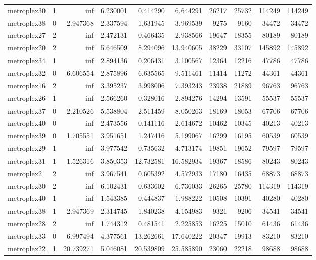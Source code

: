 \begin{longtable}{|l|r|r|r|r|r|r|r|r|r|}
metroplex30 & 1 & inf & 6.230001 & 0.414290 & 6.644291 & 26217 & 25732 & 114249 & 114249 \\
metroplex38 & 0 & 2.947368 & 2.337594 & 1.631945 & 3.969539 & 9275 & 9160 & 34472 & 34472 \\
metroplex27 & 2 & inf & 2.472131 & 0.466435 & 2.938566 & 19647 & 18355 & 80189 & 80189 \\
metroplex20 & 2 & inf & 5.646509 & 8.294096 & 13.940605 & 38229 & 33107 & 145892 & 145892 \\
metroplex34 & 1 & inf & 2.894136 & 0.206431 & 3.100567 & 12364 & 12216 & 47786 & 47786 \\
metroplex32 & 0 & 6.606554 & 2.875896 & 6.635565 & 9.511461 & 11414 & 11272 & 44361 & 44361 \\
metroplex16 & 2 & inf & 3.395237 & 3.998006 & 7.393243 & 23938 & 21889 & 96763 & 96763 \\
metroplex26 & 1 & inf & 2.566260 & 0.328016 & 2.894276 & 14294 & 13591 & 55537 & 55537 \\
metroplex37 & 0 & 2.210526 & 5.538804 & 2.511459 & 8.050263 & 18169 & 18053 & 67706 & 67706 \\
metroplex40 & 0 & inf & 2.473556 & 0.141116 & 2.614672 & 10462 & 10345 & 40213 & 40213 \\
metroplex39 & 0 & 1.705551 & 3.951651 & 1.247416 & 5.199067 & 16299 & 16195 & 60539 & 60539 \\
metroplex29 & 1 & inf & 3.977542 & 0.735632 & 4.713174 & 19851 & 19652 & 79597 & 79597 \\
metroplex31 & 1 & 1.526316 & 3.850353 & 12.732581 & 16.582934 & 19367 & 18586 & 80243 & 80243 \\
metroplex2 & 2 & inf & 3.967541 & 0.605392 & 4.572933 & 17180 & 16435 & 68873 & 68873 \\
metroplex30 & 2 & inf & 6.102431 & 0.633602 & 6.736033 & 26265 & 25780 & 114319 & 114319 \\
metroplex40 & 1 & inf & 1.543385 & 0.444837 & 1.988222 & 10508 & 10391 & 40280 & 40280 \\
metroplex38 & 1 & 2.947369 & 2.314745 & 1.840238 & 4.154983 & 9321 & 9206 & 34541 & 34541 \\
metroplex28 & 2 & inf & 1.744312 & 0.481541 & 2.225853 & 16225 & 15010 & 61436 & 61436 \\
metroplex33 & 0 & 6.997494 & 4.377561 & 13.262661 & 17.640222 & 20347 & 19913 & 83210 & 83210 \\
metroplex22 & 1 & 20.739271 & 5.046081 & 20.539809 & 25.585890 & 23060 & 22218 & 98688 & 98688 \\

\end{longtable}
